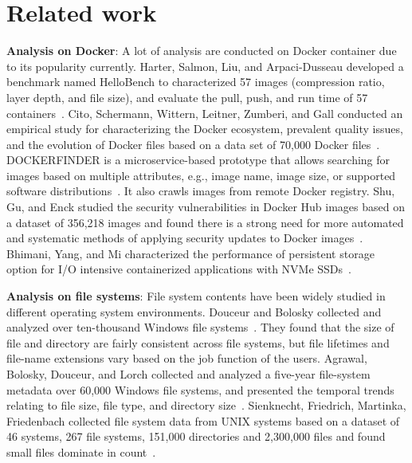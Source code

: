 \section{Related work}
\label{sec:related}

\textbf{Analysis on Docker}:
A lot of analysis are conducted on Docker container due to its popularity currently. 
Harter, Salmon, Liu, and Arpaci-Dusseau developed a benchmark named HelloBench to characterized 57 images (compression ratio, layer depth, and file size), and evaluate the pull, push, and run time of 57 containers~\cite{slacker}.
Cito, Schermann, Wittern, Leitner, Zumberi, and Gall conducted an empirical study for characterizing the Docker ecosystem, prevalent quality issues, and the evolution of Docker files based on a data set of 70,000 Docker files~\cite{dockervulnerabile}.
DOCKERFINDER is a microservice-based prototype that allows searching for images based on multiple attributes, e.g., image name, image size, or supported software distributions~\cite{dockerfinder}. It also crawls images from remote Docker registry.
Shu, Gu, and Enck studied the security vulnerabilities in Docker Hub images based on a dataset of 356,218 images and found there is a strong need for more automated and systematic methods of applying security updates to Docker images~\cite{analysisdockergithub}.
Bhimani, Yang, and Mi characterized the performance of persistent storage option for I/O intensive containerized applications with NVMe SSDs~\cite{dockerssd}.

\textbf{Analysis on file systems}:
File system contents have been widely studied in different operating system environments.
Douceur and Bolosky collected and analyzed over ten-thousand Windows file systems~\cite{largefscontent}. They found that the size of file and directory are fairly consistent across file systems, but file lifetimes and file-name extensions vary based on the job function of the users. 
Agrawal, Bolosky, Douceur, and Lorch collected and analyzed a five-year file-system metadata over 60,000 Windows file systems, and presented the temporal trends relating to file size, file type, and directory size~\cite{fiveyearfsmetadata}.
Sienknecht, Friedrich, Martinka, Friedenbach collected file system data from UNIX systems based on a dataset of 46 systems, 267 file systems, 151,000 directories and 2,300,000 files and found small files dominate in count~\cite{distributedatainfs}.
